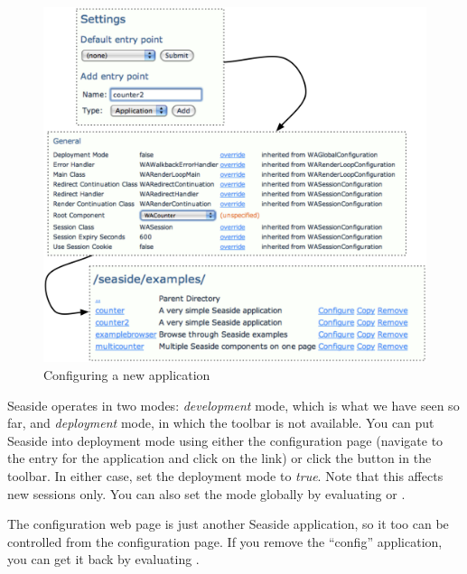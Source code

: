 \documentclass[a4paper,10pt,twoside]{book}
\begin{document}
\begin{figure}[ht]
\begin{center}
\includegraphics[width=\textwidth]{counter2}
\caption{Configuring a new application}
\end{center}
\end{figure}

Seaside operates in two modes: \emph{development} mode, which is what we have seen so far, and \emph{deployment} mode, in which the toolbar is not available.
You can put Seaside into deployment mode using either the configuration page (navigate to the entry for the application and click on the  link)
or click the  button in the toolbar.
In either case, set the deployment mode to \emph{true}.
Note that this affects new sessions only.
You can also set the mode globally by evaluating
 
or
.

The configuration web page is just another Seaside application, so it too can be controlled from the configuration page.
If you remove the ``config'' application, you can get it back by evaluating
 .
\end{document}
